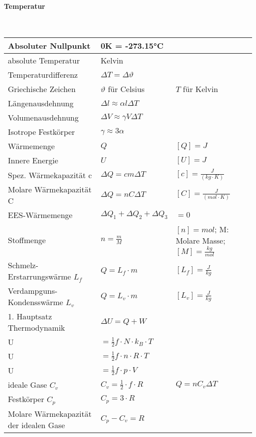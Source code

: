 \paragraph{Temperatur}\mbox{}\\
\noindent
\begin{tabularx}{\columnwidth}{@{}XXX@{}}
	Absoluter Nullpunkt & 0K = -273.15°C \\ \hline
	absolute Temperatur & Kelvin \\ \hline
	Temperaturdifferenz & $\Delta T = \Delta \vartheta$ \\ \hline
	Griechische Zeichen & $\vartheta$ für Celsius & $T$ für Kelvin \\ \hline
	Längenausdehnung & $\Delta l \approx \alpha l \Delta T$ \\ \hline
	Volumenausdehnung & $\Delta V \approx \gamma V \Delta T$ \\ \hline
	Isotrope Festkörper & $\gamma \approx 3\alpha$ \\ \hline
	Wärmemenge & $Q$ & $[Q] = J$ \\ \hline
	Innere Energie & $U$ & $[U] = J$ \\ \hline
	Spez. Wärmekapazität c & $\Delta Q = cm\Delta T$ & $[c] = \frac{J}{(kg\cdot K)}$ \\ \hline
	Molare Wärmekapazität C & $\Delta Q = nC\Delta T$ & $[C] = \frac{J}{(mol\cdot K)}$ \\ \hline
	EES-Wärmemenge & $\Delta Q_1 + \Delta Q_2 + \Delta Q_3$ & $= 0$ \\ \hline
	Stoffmenge & $n = \frac{m}{M}$ & $[n] = mol$; M: Molare Masse; $[M] = \frac{kg}{mol}$ \\ \hline
	Schmelz-Erstarrungswärme $L_f$ & $Q = L_f\cdot m$ & $[L_f] = \frac{J}{kg}$ \\ \hline
	Verdampguns-Kondensswärme $L_v$ & $Q = L_v\cdot m$ & $[L_v] = \frac{J}{kg}$ \\ \hline
	1. Hauptsatz Thermodynamik & $\Delta U = Q + W$ \\ \hline
	U & $= \frac{1}{2}f\cdot N\cdot k_B \cdot T$ \\ \hline
	U & $= \frac{1}{2}f\cdot n\cdot R \cdot T$ \\ \hline
	U & $= \frac{1}{2}f\cdot p \cdot V$ \\ \hline
	ideale Gase $C_v$ & $C_v = \frac{1}{2}\cdot f \cdot R$ & $Q = nC_v\Delta T$ \\ \hline
	Festkörper $C_p$ & $C_p = 3\cdot R$ \\ \hline
	Molare Wärmekapazität der idealen Gase & $C_p - C_v = R$ \\ \hline

\end{tabularx}

